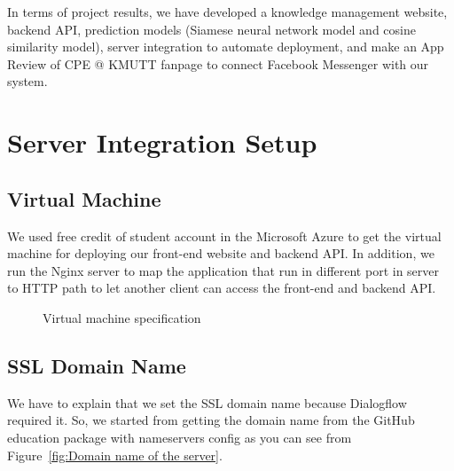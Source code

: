 \documentclass[12pt,oneside,openright,a4paper]{cpe-english-project}
\begin{document}
In terms of project results, we have developed a knowledge management website, backend API, prediction models (Siamese neural network model and cosine similarity model), server integration to automate deployment, and make an App Review of CPE @ KMUTT fanpage to connect Facebook Messenger with our system.

\pagebreak
\section{Server Integration Setup}
\subsection{Virtual Machine}
We used free credit of student account in the Microsoft Azure to get
the virtual machine for deploying our front-end website and backend API.
In addition, we run the Nginx server to map the application that run in
different port in server to HTTP path to let another client can access the
front-end and backend API.
\begin{figure}[!h]\centering
	\caption{Virtual machine specification}\label{fig:Virtual machine specification}
\end{figure}

\pagebreak
\subsection{SSL Domain Name}
We have to explain that we set the SSL domain name because Dialogflow required it.
So, we started from getting the domain name from the GitHub education package with
nameservers config as you can see from Figure~\ref*{fig:Domain name of the server}.
\end{document}

